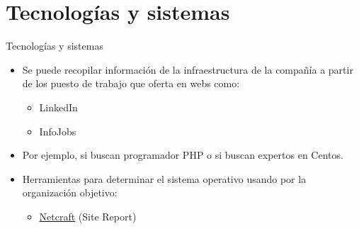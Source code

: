 \documentclass[aspectratio=169,11pt]{beamer}
\begin{document}
\section{Tecnologías y sistemas}

\begin{frame}[allowframebreaks]{Tecnologías y sistemas}
\small
  \begin{itemize}
  \item Se puede recopilar información de la infraestructura de la compañía a partir de los puesto de trabajo que oferta en webs como:
    \begin{itemize}

  \item LinkedIn
  \item InfoJobs
\end{itemize}
  \item Por ejemplo, si buscan programador PHP o si buscan expertos en Centos.
  
  \item Herramientas para determinar el sistema operativo usando por la organización objetivo:
    \begin{itemize}
  \item \href{https://sitereport.netcraft.com/}{Netcraft} (Site Report)
 
\end{itemize}
  \end{itemize}
\end{frame}
\end{document}
